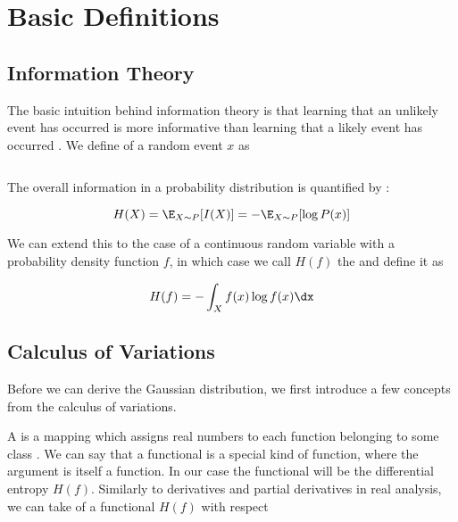 \chapter{Basic Definitions}

\section{Information Theory}

The basic intuition behind information theory is that learning that an unlikely
event has occurred is more informative than learning that a likely event has
occurred \citep{Goodfellow-et-al-2016}. We define  of
a random event $x$ as


\begin{equation}
\end{equation}

The overall information in a probability distribution is quantified by
:

\begin{equation}
  H(X) = \E_{X \sim P} [ I(X) ] = -\E_{X \sim P} [ \log P(x) ]
\end{equation}

We can extend this to the case of a continuous random variable with a
probability density function $f$, in which case we call $H(f)$ the
 and define it as

\begin{equation}
  H(f) = - \int_X f(x) \log f(x) \dx
\end{equation}

\section{Calculus of Variations}

Before we can derive the Gaussian distribution, we first introduce a few
concepts from the calculus of variations.

A  is a mapping which assigns real numbers to each function
belonging to some class \citep{gelfand2012calculus}. We can say that a
functional is a special kind of function, where the argument is itself a
function. In our case the functional will be the differential entropy $H(f)$.
Similarly to derivatives and partial derivatives in real analysis, we can take
 of a functional $H(f)$ with respect


